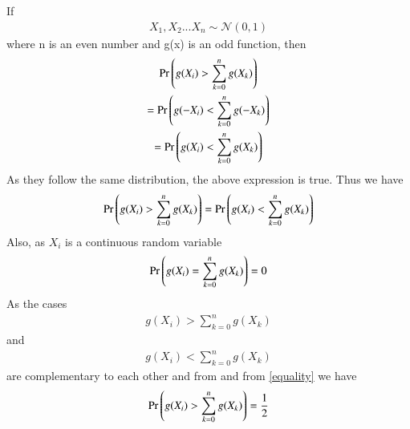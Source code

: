 \documentclass[journal,12pt,twocolumn]{IEEEtran}
\begin{document}
If 
\begin{align}
 X_1,X_2...X_n \sim \mathcal{N}(0,1)   
\end{align}
where n is an even number and g(x) is an odd function, then
\begin{multline}
    \Pr\left(g(X_i)>\sum_{k=0}^ng(X_k)\right)\\=
    \Pr\left(g(-X_i)<\sum_{k=0}^ng(-X_k)\right)\\=
    \Pr\left(g(X_i)<\sum_{k=0}^ng(X_k)\right)
\end{multline}
As they follow the same distribution, the above expression is true. Thus we have
\begin{align}\label{equality}
    \Pr\left(g(X_i)>\sum_{k=0}^ng(X_k)\right)=
    \Pr\left(g(X_i)<\sum_{k=0}^ng(X_k)\right)
\end{align}
Also, as $X_i$ is a continuous random variable
\begin{align}
    \Pr\left(g(X_i)=\sum_{k=0}^ng(X_k)\right)=0
\end{align}
As the cases
\begin{align}
    g(X_i)>\sum_{k=0}^ng(X_k)
\end{align}
and
\begin{align}
    {g(X_i)<\sum_{k=0}^ng(X_k)}
\end{align}
are complementary to each other and from 
and from \eqref{equality} we have
\begin{align}\label{sum}
 \Pr\left(g(X_i)>\sum_{k=0}^ng(X_k)\right)=\frac{1}{2}    
\end{align}
\end{document}
